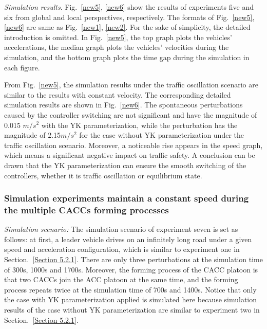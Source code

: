\documentclass[trsc,nonblindrev]{informs3} %
\begin{document}
\textit{Simulation results}. Fig.~\ref{new5}, \ref{new6} show the results of experiments five and six from global and local perspectives, respectively. The formats of Fig.~\ref{new5}, \ref{new6} are same as Fig.~\ref{new1}, \ref{new2}. For the sake of simplicity, the detailed introduction is omitted. In Fig.~\ref{new5}, the top graph plots the vehicles' accelerations, the median graph plots the vehicles' velocities during the simulation, and the bottom graph plots the time gap during the simulation in each figure.

From Fig.~\ref{new5}, the simulation results under the traffic oscillation scenario are similar to the results with constant velocity. The corresponding detailed simulation results are shown in Fig.~\ref{new6}. The spontaneous perturbations caused by the controller switching are not significant and have the magnitude of 0.015 $m/s^2$ with the YK parameterization, while the perturbation has the magnitude of 2.15$m/s^2$ for the case without YK parameterization under the traffic oscillation scenario. Moreover, a noticeable rise appears in the speed graph, which means a significant negative impact on traffic safety. A conclusion can be drawn that the YK parameterization can ensure the smooth switching of the controllers, whether it is traffic oscillation or equilibrium state.

\subsubsection{Simulation experiments maintain a constant speed during the multiple CACCs forming processes}
\label{Section 5.2.3}

\textit{Simulation scenario:} The simulation scenario of experiment seven is set as follows: at first, a leader vehicle drives on an infinitely long road under a given speed and acceleration configuration, which is similar to experiment one in Section.~\ref{Section 5.2.1}. There are only three perturbations at the simulation time of 300s, 1000s and 1700s. Moreover, the forming process of the CACC platoon is that two CACCs join the ACC platoon at the same time, and the forming process repeats twice at the simulation time of 700s and 1400s. Notice that only the case with YK parameterization applied is simulated here because simulation results of the case without YK parameterization are similar to experiment two in Section.~\ref{Section 5.2.1}.
\end{document}
